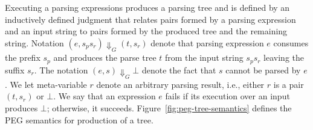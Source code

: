 Executing a parsing expressions produces a parsing tree and is defined by an
inductively defined judgment that relates pairs formed by a parsing expression
and an input string to pairs formed by the produced tree and the remaining string.
Notation \((e,s_ps_r) \Downarrow_G (t,s_r)\) denote that parsing expression \(e\)
consumes the prefix \(s_p\) and produces the parse tree \(t\) from the input string
\(s_ps_r\) leaving the suffix \(s_r\). The notation \((e,s) \Downarrow_G \bot\)
denote the fact that \(s\) cannot be parsed by \(e\). We let meta-variable \(r\)
denote an arbitrary parsing result, i.e., either \(r\) is a pair \((t,s_r)\) or
\(\bot\). We say that an expression \(e\) fails if its execution over an input
produces \(\bot\); otherwise, it succeeds. Figure~\ref{fig:peg-tree-semantics}
defines the PEG semantics for production of a tree.

